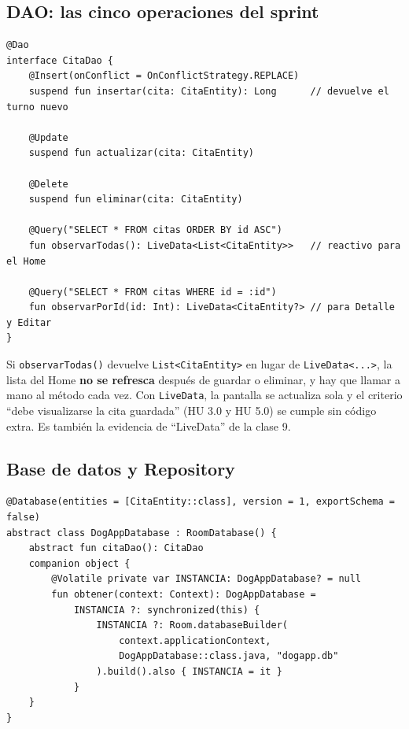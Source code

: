 \documentclass[11pt,letterpaper]{article}
\newcommand{\code}[1]{\texttt{\small #1}}
\begin{document}
\subsection{DAO: las cinco operaciones del sprint}

\begin{verbatim}
@Dao
interface CitaDao {
    @Insert(onConflict = OnConflictStrategy.REPLACE)
    suspend fun insertar(cita: CitaEntity): Long      // devuelve el turno nuevo

    @Update
    suspend fun actualizar(cita: CitaEntity)

    @Delete
    suspend fun eliminar(cita: CitaEntity)

    @Query("SELECT * FROM citas ORDER BY id ASC")
    fun observarTodas(): LiveData<List<CitaEntity>>   // reactivo para el Home

    @Query("SELECT * FROM citas WHERE id = :id")
    fun observarPorId(id: Int): LiveData<CitaEntity?> // para Detalle y Editar
}
\end{verbatim}

\begin{notabox}
Si \code{observarTodas(\allowbreak{})} devuelve \code{List<CitaEntity>} en lugar de
\code{LiveData<.\allowbreak{}..>}, la lista del Home \textbf{no se refresca} despu\'es de
guardar o eliminar, y hay que llamar a mano al m\'etodo cada vez. Con
\code{LiveData}, la pantalla se actualiza sola y el criterio
``debe visualizarse la cita guardada'' (HU 3.0 y HU 5.0) se cumple sin c\'odigo
extra. Es tambi\'en la evidencia de ``LiveData'' de la clase 9.
\end{notabox}

\subsection{Base de datos y Repository}

\begin{verbatim}
@Database(entities = [CitaEntity::class], version = 1, exportSchema = false)
abstract class DogAppDatabase : RoomDatabase() {
    abstract fun citaDao(): CitaDao
    companion object {
        @Volatile private var INSTANCIA: DogAppDatabase? = null
        fun obtener(context: Context): DogAppDatabase =
            INSTANCIA ?: synchronized(this) {
                INSTANCIA ?: Room.databaseBuilder(
                    context.applicationContext,
                    DogAppDatabase::class.java, "dogapp.db"
                ).build().also { INSTANCIA = it }
            }
    }
}
\end{verbatim}
\end{document}
